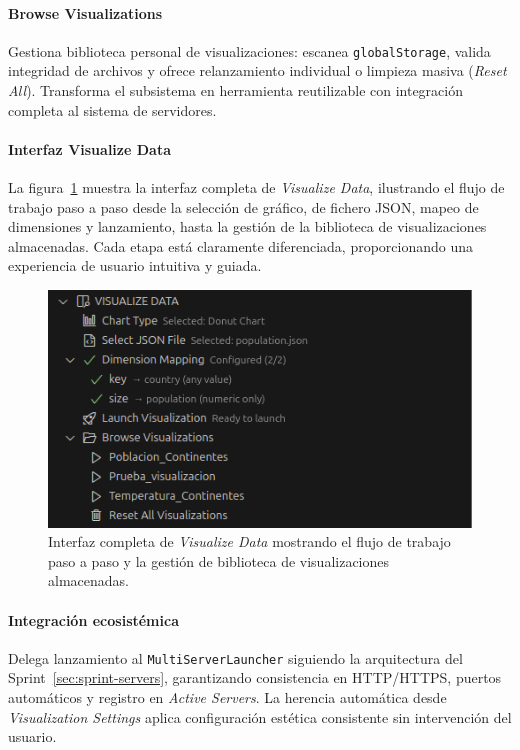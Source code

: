 \documentclass[a4paper, 12pt]{book}
\begin{document}
\paragraph{Browse Visualizations}
Gestiona biblioteca personal de visualizaciones: escanea \texttt{globalStorage}, valida integridad de archivos y ofrece relanzamiento individual o limpieza masiva (\emph{Reset All}). Transforma el subsistema en herramienta reutilizable con integración completa al sistema de servidores.

\paragraph{Interfaz Visualize Data}
La figura~\ref{fig:ui-visualize-data} muestra la interfaz completa de \emph{Visualize Data}, ilustrando el flujo de trabajo paso a paso desde la selección de gráfico, de fichero JSON, mapeo de dimensiones y lanzamiento, hasta la gestión de la biblioteca de visualizaciones almacenadas. Cada etapa está claramente diferenciada, proporcionando una experiencia de usuario intuitiva y guiada.

\begin{figure}[H]
\centering
\includegraphics[width=0.60\linewidth]{img/ui-visualize-data.png}
\caption{Interfaz completa de \emph{Visualize Data} mostrando el flujo de trabajo paso a paso y la gestión de biblioteca de visualizaciones almacenadas.}
\label{fig:ui-visualize-data}
\end{figure}

\paragraph{Integración ecosistémica}
Delega lanzamiento al \texttt{MultiServerLauncher} siguiendo la arquitectura del Sprint~\ref{sec:sprint-servers}, garantizando consistencia en HTTP/HTTPS, puertos automáticos y registro en \emph{Active Servers}. La herencia automática desde \emph{Visualization Settings} aplica configuración estética consistente sin intervención del usuario.
\end{document}
